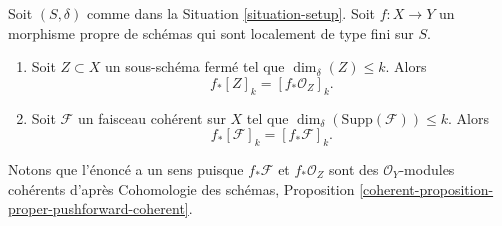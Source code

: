 \begin{lemma}
\label{lemma-cycle-push-sheaf}
Soit $(S, \delta)$ comme dans la Situation \ref{situation-setup}.
Soit $f : X \to Y$ un morphisme propre de schémas qui sont
localement de type fini sur $S$.
\begin{enumerate}
\item Soit $Z \subset X$ un sous-schéma fermé tel que $\dim_\delta(Z) \leq k$.
Alors
$$
f_*[Z]_k = [f_*{\mathcal O}_Z]_k.
$$
\item Soit $\mathcal{F}$ un faisceau cohérent sur $X$ tel que
$\dim_\delta(\text{Supp}(\mathcal{F})) \leq k$. Alors
$$
f_*[\mathcal{F}]_k = [f_*{\mathcal F}]_k.
$$
\end{enumerate}
Notons que l'énoncé a un sens puisque $f_*\mathcal{F}$ et
$f_*\mathcal{O}_Z$ sont des $\mathcal{O}_Y$-modules cohérents d'après
Cohomologie des schémas, Proposition
\ref{coherent-proposition-proper-pushforward-coherent}.
\end{lemma}

